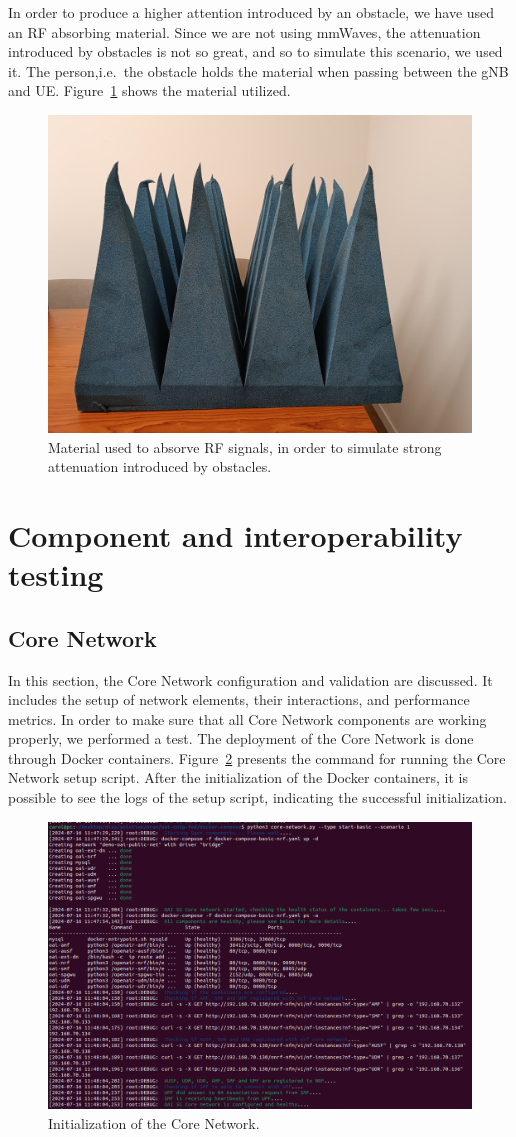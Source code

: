 In order to produce a higher attention introduced by an obstacle, we have used an RF absorbing material.
Since we are not using mmWaves, the attenuation introduced by obstacles is not so great, and so to simulate this scenario, we used it.
The person,i.e.\ the obstacle holds the material when passing between the gNB and UE\@.
Figure~\ref{fig:foam} shows the material utilized.

\begin{figure}[H]
    \centering
    \includegraphics[width=0.5\linewidth]{figures/foam}
    \caption{Material used to absorve RF signals, in order to simulate strong attenuation introduced by obstacles.}
    \label{fig:foam}
\end{figure}



\section{Component and interoperability testing}\label{sec:component-testing}


\subsection{Core Network}\label{subsec:core_network}
In this section, the Core Network configuration and validation are discussed.
It includes the setup of network elements, their interactions, and performance metrics.
In order to make sure that all Core Network components are working properly, we performed a test.
The deployment of the Core Network is done through Docker containers.
Figure~\ref{fig:core_init} presents the command for running the Core Network setup script.
After the initialization of the Docker containers, it is possible to see the logs of the setup script, indicating the successful initialization.

\begin{figure}[H]
    \centering
    \includegraphics[width=0.5\linewidth]{figures/core_init}
    \caption[Initialization of the Core Network]{Initialization of the Core Network.}
    \label{fig:core_init}
\end{figure}

